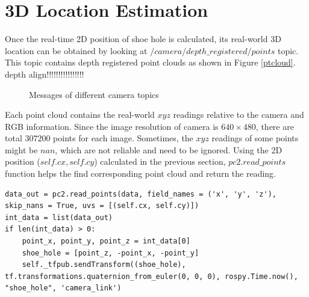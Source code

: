 \section{3D Location Estimation} \label{3dlocationestimation}
Once the real-time 2D position of shoe hole is calculated, its real-world 3D location can be obtained by looking at $/camera/depth\_registered/points$ topic. This topic contains depth registered point clouds as shown in Figure \ref{ptcloud}. depth align!!!!!!!!!!!!!!!!

\begin{figure}[H]
\centering
{}
\caption{Messages of different camera topics}
\end{figure}

Each point cloud contains the real-world $xyz$ readings relative to the camera and RGB information. Since the image resolution of camera is $640 \times 480$, there are total $307200$ points for each image. Sometimes, the $xyz$ readings of some points might be $nan$, which are not reliable and need to be ignored. Using the 2D position ($self.cx, self.cy$) calculated in the previous section, $pc2.read\_points$ function helps the find corresponding point cloud and return the reading.

\begin{verbatim}
data_out = pc2.read_points(data, field_names = ('x', 'y', 'z'), skip_nans = True, uvs = [(self.cx, self.cy)])
int_data = list(data_out)
if len(int_data) > 0:
    point_x, point_y, point_z = int_data[0]
    shoe_hole = [point_z, -point_x, -point_y]
    self._tfpub.sendTransform((shoe_hole), tf.transformations.quaternion_from_euler(0, 0, 0), rospy.Time.now(), "shoe_hole", 'camera_link')
\end{verbatim}

